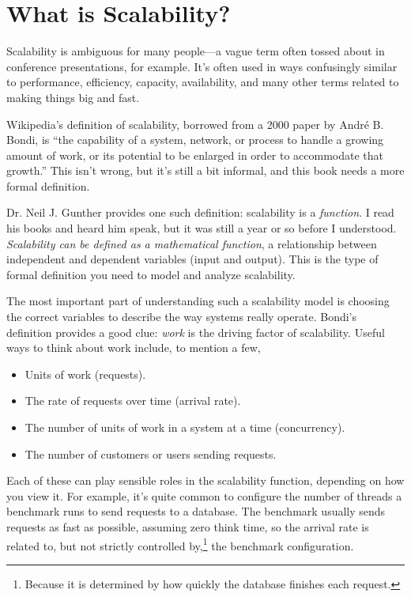 \documentclass{vivid_layout}
\begin{document}
\newpage

\section{What is Scalability?}

Scalability is ambiguous for many people---a vague term often tossed about in
conference presentations, for example. It's often used in ways confusingly
similar to performance, efficiency, capacity, availability, and many other terms
related to making things big and fast.

Wikipedia's definition of scalability, borrowed from a 2000 paper by Andr\'e B.
Bondi, is ``the capability of a system, network, or process to
handle a growing amount of work, or its potential to be enlarged in order to
accommodate that growth.'' This isn't wrong, but it's still a bit informal, and
this book needs a more formal definition.

Dr. Neil J. Gunther provides one such definition: scalability is a {\itshape
function}. I read his books and heard him speak, but it was still a year or so
before I understood. {\itshape Scalability can be defined as a
mathematical function}, a relationship between independent and dependent
variables (input and output). This is the type of formal definition you need to
model and analyze scalability.

The most important part of understanding such a scalability model is choosing
the correct variables to describe the way systems really operate.  Bondi's
definition provides a good clue: {\itshape work} is the driving factor of
scalability. Useful ways to think about work include, to mention a few,

\begin{itemize}
\item Units of work (requests).
\item The rate of requests over time (arrival rate).
\item The number of units of work in a system at a time (concurrency).
\item The number of customers or users sending requests.
\end{itemize}

Each of these can play sensible roles in the scalability function, depending on
how you view it. For example, it's quite common to configure the number of
threads a benchmark runs to send requests to a database. The benchmark usually
sends requests as fast as possible, assuming zero think time, so the arrival
rate is related to, but not strictly controlled by,\footnote{Because it is
determined by how quickly the database finishes each request.} the benchmark
configuration.
\end{document}
